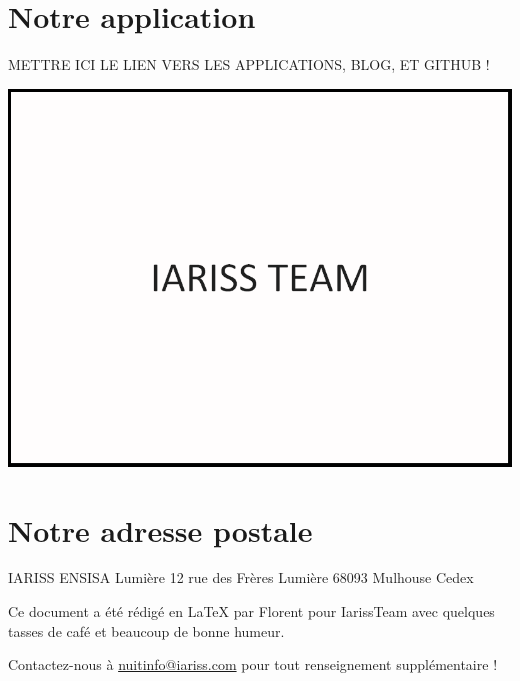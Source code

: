 \documentclass[12pt, a4paper]{article}
\newcommand{\espace}{\vspace{.8cm}}
\newcommand{\authors}{Florent}
\begin{document}
\section*{Notre application}
METTRE ICI LE LIEN VERS LES APPLICATIONS, BLOG, ET GITHUB !
\espace{}
\begin{center}
\includegraphics[width=.9\textwidth, keepaspectratio=true]{img/test.png}
\end{center}

\espace{}
\section*{Notre adresse postale}
	
IARISS
ENSISA Lumière
12 rue des Frères Lumière
68093 Mulhouse Cedex


\espace\vfill{}
Ce document a été rédigé en \LaTeX{} par \authors{} pour IarissTeam avec quelques tasses de café et beaucoup de bonne humeur.

Contactez-nous à \href{mailto:nuitinfo@iariss.com}{nuitinfo@iariss.com} pour tout renseignement supplémentaire !
\end{document}
